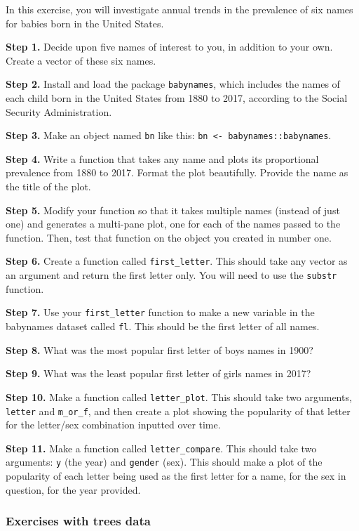 \documentclass[
]{book}
\begin{document}
In this exercise, you will investigate annual trends in the prevalence of six names for babies born in the United States.

\textbf{Step 1.} Decide upon five names of interest to you, in addition to your own. Create a vector of these six names.

\textbf{Step 2.} Install and load the package \texttt{babynames}, which includes the names of each child born in the United States from 1880 to 2017, according to the Social Security Administration.

\textbf{Step 3.} Make an object named \texttt{bn} like this: \texttt{bn\ \textless{}-\ babynames::babynames}.

\textbf{Step 4.} Write a function that takes any name and plots its proportional prevalence from 1880 to 2017. Format the plot beautifully. Provide the name as the title of the plot.

\textbf{Step 5.} Modify your function so that it takes multiple names (instead of just one) and generates a multi-pane plot, one for each of the names passed to the function. Then, test that function on the object you created in number one.

\textbf{Step 6.} Create a function called \texttt{first\_letter}. This should take any vector as an argument and return the first letter only. You will need to use the \texttt{substr} function.

\textbf{Step 7.} Use your \texttt{first\_letter} function to make a new variable in the babynames dataset called \texttt{fl}. This should be the first letter of all names.

\textbf{Step 8.} What was the most popular first letter of boys names in 1900?

\textbf{Step 9.} What was the least popular first letter of girls names in 2017?

\textbf{Step 10.} Make a function called \texttt{letter\_plot}. This should take two arguments, \texttt{letter} and \texttt{m\_or\_f}, and then create a plot showing the popularity of that letter for the letter/sex combination inputted over time.

\textbf{Step 11.} Make a function called \texttt{letter\_compare}. This should take two arguments: \texttt{y} (the year) and \texttt{gender} (sex). This should make a plot of the popularity of each letter being used as the first letter for a name, for the sex in question, for the year provided.

\hypertarget{exercises-with-trees-data}{%
\subsubsection*{Exercises with trees data}\label{exercises-with-trees-data}}
\end{document}
